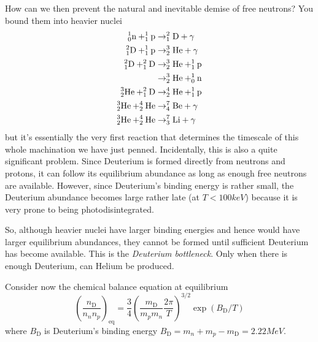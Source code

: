 \par How can we then prevent the natural and inevitable demise of free neutrons? You bound them into heavier nuclei 
\begin{align*}
    \element{n}{1}{0} + \element{p}{1}{1} &\to \element{D}{2}{1} + \gamma \\
    \element{D}{2}{1} + \element{p}{1}{1} &\to \element{He}{3}{2} + \gamma \\
    \element{D}{2}{1} + \element{D}{2}{1} &\to \element{He}{3}{2} + \element{p}{1}{1} \\
    &\to \element{He}{3}{2} + \element{n}{1}{0} \\
    \element{He}{3}{2} + \element{D}{2}{1} &\to \element{He}{4}{2} + \element{p}{1}{1} \\
    \element{He}{3}{2} + \element{He}{4}{2} &\to \element{Be}{7}{4} + \gamma \\
    \element{He}{3}{2} + \element{He}{4}{2} &\to \element{Li}{7}{3} + \gamma
\end{align*}
but it's essentially the very first reaction that determines the timescale of this whole machination we have just penned. Incidentally, this is also a quite significant problem. Since Deuterium is formed directly from neutrons and protons, it can follow its equilibrium abundance as long as enough free neutrons are available. However, since Deuterium's binding energy is rather small, the Deuterium abundance becomes large rather late (at $T < 100 \unit{keV}$) because it is very prone to being photodisintegrated.
\par So, although heavier nuclei have larger binding energies and hence would have larger equilibrium abundances, they cannot be formed until sufficient Deuterium has become available. This is the \emph{Deuterium bottleneck}. Only when there is enough Deuterium, can Helium be produced.
\par Consider now the chemical balance equation at equilibrium 
\begin{equation}
    \left(\frac{n_{\text{D}}}{n_{n}n_{p}}\right)_{\text{eq}} = \frac{3}{4}\left(\frac{m_{\text{D}}}{m_{p}m_{n}}\frac{2\pi}{T}\right)^{3/2}\exp(B_{\text{D}}/T)
\end{equation}
where $B_{\text{D}}$ is Deuterium's binding energy $B_{\text{D}} = m_{n}+m_{p}-m_{\text{D}} = 2.22\unit{MeV}$.
